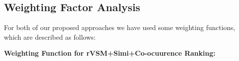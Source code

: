 \documentclass[conference]{IEEEtran}
\begin{document}
\subsection{Weighting Factor Analysis}
For both of our proposed approaches we have used some weighting functions, which are described as follows:

\textbf{Weighting Function for rVSM+Simi+Co-ocuurence Ranking:}
\begin{table}[htbp]
\centering
\caption{Performance of (rVSM+Simi+Co-Occerence) for different weighting factors}
\label{tab:alphaApproach1}
\end{table}
\end{document}
